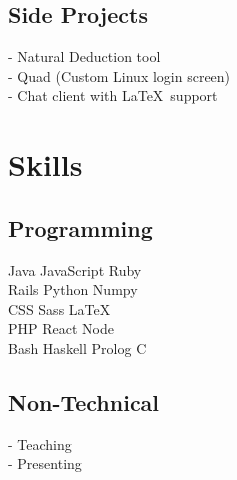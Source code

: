 \documentclass[]{deedy-resume-openfont}
\begin{document}
\begin{minipage}[t]{0.33\textwidth}
\subsection{Side Projects}
- Natural Deduction tool\\
- Quad (Custom Linux login screen)\\
- Chat client with \LaTeX \ support\\
\sectionsep


\section{Skills}
\subsection{Programming}
Java \textbullet{} JavaScript \textbullet{} Ruby\\
Rails \textbullet{} Python \textbullet{} Numpy\\
CSS \textbullet{} Sass \textbullet{} \LaTeX\ \\ 
PHP \textbullet{} React  \textbullet{} Node \\
Bash \textbullet{} Haskell \textbullet{} Prolog \textbullet{} C
\sectionsep

\subsection{Non-Technical}
- Teaching\\
- Presenting\\
\sectionsep

%
%

\end{minipage} 
\hfill
\end{document}
